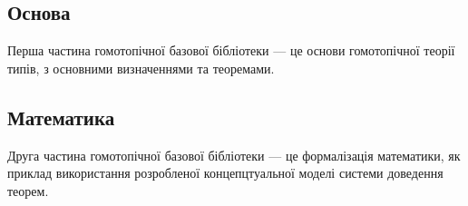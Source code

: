 \subsection{Основа}

Перша частина гомотопічної базової бібліотеки --- це основи гомотопічної теорії типів,
з основними визначеннями та теоремами.

\subsection{Математика}

Друга частина гомотопічної базової бібліотеки --- це формалізація математики, як
приклад використання розробленої концепцтуальної моделі системи доведення теорем.


